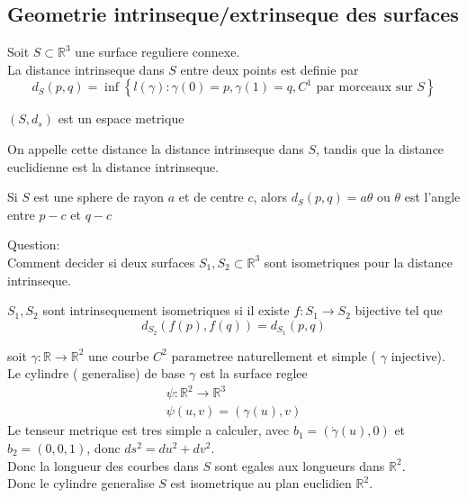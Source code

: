 \documentclass[../main.tex]{subfiles}
\begin{document}
\subsection{Geometrie intrinseque/extrinseque des surfaces}
\begin{defn}
	Soit $S \subset \mathbb{R}^{3}$ une surface reguliere connexe.\\
	La distance intrinseque dans $S$ entre deux points est definie par
	\[ 
	d_S( p,q) = \inf \left\{ l( \gamma) : \gamma( 0) =p, \gamma( 1) =q, C^{1} \text{ par morceaux sur } S \right\} 
	\]
		
\end{defn}
\begin{lemma}
$( S,d_s) $ est un espace metrique 
\end{lemma}
\begin{defn}
	On appelle cette distance la distance intrinseque dans $S$, tandis que la distance euclidienne est la distance intrinseque.
\end{defn}
\begin{exemple}
Si $S$ est une sphere de rayon $a$ et de centre $c$, alors $d_S( p,q) = a\theta$ ou $\theta$ est l'angle entre $p-c$ et $q-c$ 
\end{exemple}
Question:\\
Comment decider si deux surfaces $S_1,S_2 \subset \mathbb{R}^{3}$ sont isometriques pour la distance intrinseque.
\begin{defn}	
$S_1,S_2$ sont intrinsequement isometriques si il existe $f: S_1\to S_2$ bijective tel que
\[ 
d_{S_2} ( f( p), f( q) ) = d_{S_1} ( p,q) 
\]

\end{defn}
\begin{exemple}
soit $\gamma: \mathbb{R}\to \mathbb{R}^{2}$ une courbe $C^{2}$ parametree naturellement et simple ( $\gamma$ injective).\\
Le cylindre ( generalise) de base $\gamma$ est la surface reglee
\begin{align*}
\psi: \mathbb{R}^{2}\to \mathbb{R}^{3}\\
\psi( u,v) = ( \gamma( u) , v) 
\end{align*}
Le tenseur metrique est tres simple a calculer, avec $b_1 = ( \dot\gamma ( u),0 ) $ et $b_2 = ( 0,0,1) $, donc $ds^{2}= du^{2}+dv^{2}$.\\
Donc la longueur des courbes dans $S$ sont egales aux longueurs dans $\mathbb{R}^{2}$.\\
Donc le cylindre generalise $S$ est isometrique au plan euclidien $\mathbb{R}^{2}$.
\end{exemple}
\end{document}
